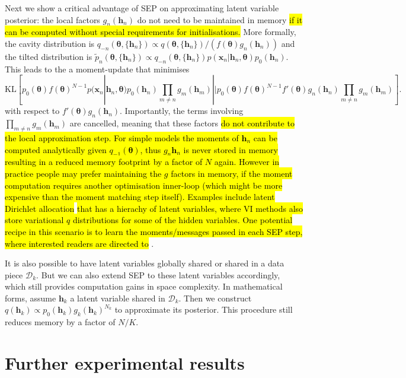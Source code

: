\documentclass{article} %
\begin{document}
Next we show a critical advantage of SEP on approximating latent variable posterior: the local factors $g_n(\bm{h}_n)$ do not need to be maintained in memory \hl{if it can be computed without special requirements for initialisations.} 
%
More formally, the cavity distribution is $q_{-n}(\bm{\theta}, \{ \bm{h}_n\}) \propto q(\bm{\theta}, \{ \bm{h}_n\})/(f(\bm{\theta}) g_n(\bm{h}_n)) $ and the tilted distribution is $\tilde{p}_n(\bm{\theta}, \{ \bm{h}_n\}) \propto q_{-n}(\bm{\theta}, \{ \bm{h}_n\}) p(\bm{x}_n | \bm{h}_n, \bm{\theta})p_0(\bm{h}_n)$. This leads to the a moment-update that minimises 
%
\begin{equation}
\mathrm{KL}[ p_0(\bm{\theta}) f(\bm{\theta})^{N-1} p(\bm{x}_n | \bm{h}_n, \bm{\theta})p_0(\bm{h}_n) \prod_{m\ne n} g_m(\bm{h}_m) || p_0(\bm{\theta}) f(\bm{\theta})^{N-1} f'(\bm{\theta}) g_n(\bm{h}_n) \prod_{m\ne n} g_m(\bm{h}_m)] .\nonumber
\end{equation}
%
with respect to $f'(\bm{\theta}) g_n(\bm{h}_n)$. Importantly, the terms involving $\prod_{m\ne n} g_m(\bm{h}_m)$ are cancelled, meaning that these factors \hl{do not contribute to the local approximation step. For simple models the moments of $\bm{h}_n$ can be computed analytically given $q_{-1}(\bm{\theta})$, thus $g_n{\bm{h}_n}$ is never stored in memory resulting in a reduced memory footprint by a factor of $N$ again. However in practice people may prefer maintaining the $g$ factors in memory, if the moment computation requires another optimisation inner-loop (which might be more expensive than the moment matching step itself). Examples include latent Dirichlet allocation} \cite{blei:lda} \hl{that has a hierachy of latent variables, where VI methods also store variational $q$ distributions for some of the hidden variables. One potential recipe in this scenario is to learn the moments/messages passed in each SEP step, where interested readers are directed to} \cite{heess:learning_messages, jitkrittum:kernel}.

It is also possible to have latent variables globally shared or shared in a data piece $\mathcal{D}_k$. But we can also extend SEP to these latent variables accordingly, which still provides computation gains in space complexity. In mathematical forms, assume $\bm{h}_k$ a latent variable shared in $\mathcal{D}_k$. Then we construct $q(\bm{h}_k) \propto p_0(\bm{h}_k) g_k(\bm{h}_k)^{N_k}$ to approximate its posterior. This procedure still reduces memory by a factor of $N/K$.

\section{Further experimental results}
\end{document}
